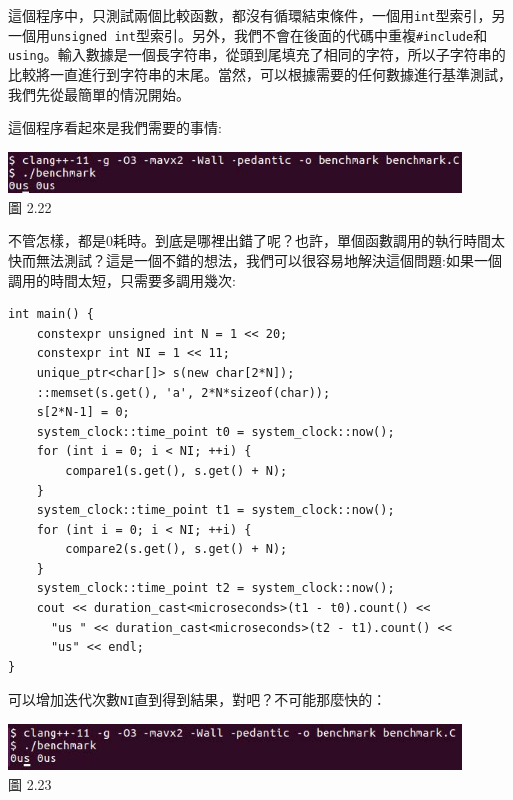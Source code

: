 這個程序中，只測試兩個比較函數，都沒有循環結束條件，一個用\texttt{int}型索引，另一個用\texttt{unsigned int}型索引。另外，我們不會在後面的代碼中重複\texttt{\#include}和\texttt{using}。輸入數據是一個長字符串，從頭到尾填充了相同的字符，所以子字符串的比較將一直進行到字符串的末尾。當然，可以根據需要的任何數據進行基準測試，我們先從最簡單的情況開始。

這個程序看起來是我們需要的事情:

\begin{center}
\includegraphics[width=0.9\textwidth]{content/1/chapter2/images/22.jpg}\\
圖 2.22
\end{center}

不管怎樣，都是0耗時。到底是哪裡出錯了呢？也許，單個函數調用的執行時間太快而無法測試？這是一個不錯的想法，我們可以很容易地解決這個問題:如果一個調用的時間太短，只需要多調用幾次:

\begin{lstlisting}[style=styleCXX]
int main() {
	constexpr unsigned int N = 1 << 20;
	constexpr int NI = 1 << 11;
	unique_ptr<char[]> s(new char[2*N]);
	::memset(s.get(), 'a', 2*N*sizeof(char));
	s[2*N-1] = 0;
	system_clock::time_point t0 = system_clock::now();
	for (int i = 0; i < NI; ++i) {
		compare1(s.get(), s.get() + N);
	}
	system_clock::time_point t1 = system_clock::now();
	for (int i = 0; i < NI; ++i) {
		compare2(s.get(), s.get() + N);
	}
	system_clock::time_point t2 = system_clock::now();
	cout << duration_cast<microseconds>(t1 - t0).count() <<
	  "us " << duration_cast<microseconds>(t2 - t1).count() <<
	  "us" << endl;
}
\end{lstlisting}

可以增加迭代次數\texttt{NI}直到得到結果，對吧？不可能那麼快的：

\begin{center}
\includegraphics[width=0.9\textwidth]{content/1/chapter2/images/23.jpg}\\
圖 2.23
\end{center}

